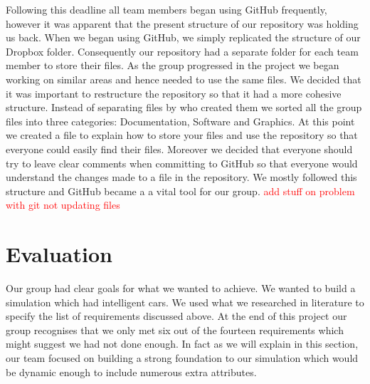 \documentclass{article}
\begin{document}
    Following this deadline all team members began using GitHub frequently, however it was apparent that the present structure of our repository was holding us back. When we began using GitHub, we simply replicated the structure of our Dropbox folder. Consequently our repository had a separate folder for each team member to store their files. As the group progressed in the project we began working on similar areas and hence needed to use the same files. We decided that it was important to restructure the repository so that it had a more cohesive structure. Instead of separating files by who created them we sorted all the group files into three categories: Documentation, Software and Graphics. At this point we created a file to explain how to store your files and use the repository so that everyone could easily find their files. Moreover we decided that everyone should try to leave clear comments when committing to GitHub so that everyone would understand the changes made to a file in the repository. We mostly followed this structure and GitHub became a a vital tool for our group. 
    \textcolor{red}{add stuff on problem with git not updating files}
   
    
	\section{Evaluation}
	Our group had clear goals for what we wanted to achieve. We wanted to build a simulation which had intelligent cars. We used what we researched in literature to specify the list of requirements discussed above. At the end of this project our group recognises that we only met six out of the fourteen requirements which might suggest we had not done enough. In fact as we will explain in this section, our team focused on building a strong foundation to our simulation which would be dynamic enough to include numerous extra attributes. 
	
\end{document}
